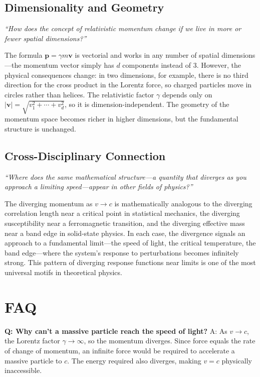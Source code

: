 \subsection*{Dimensionality and Geometry}
\textit{``How does the concept of relativistic momentum change if we live in more or fewer spatial dimensions?''}

The formula $\mathbf{p} = \gamma m \mathbf{v}$ is vectorial and works in any number of spatial dimensions---the momentum vector simply has $d$ components instead of 3. However, the physical consequences change: in two dimensions, for example, there is no third direction for the cross product in the Lorentz force, so charged particles move in circles rather than helices. The relativistic factor $\gamma$ depends only on $|\mathbf{v}| = \sqrt{v_1^2 + \cdots + v_d^2}$, so it is dimension-independent. The geometry of the momentum space becomes richer in higher dimensions, but the fundamental structure is unchanged.

\subsection*{Cross-Disciplinary Connection}
\textit{``Where does the same mathematical structure---a quantity that diverges as you approach a limiting speed---appear in other fields of physics?''}

The diverging momentum as $v \to c$ is mathematically analogous to the diverging correlation length near a critical point in statistical mechanics, the diverging susceptibility near a ferromagnetic transition, and the diverging effective mass near a band edge in solid-state physics. In each case, the divergence signals an approach to a fundamental limit---the speed of light, the critical temperature, the band edge---where the system's response to perturbations becomes infinitely strong. This pattern of diverging response functions near limits is one of the most universal motifs in theoretical physics.

\section*{FAQ}

\textbf{Q: Why can't a massive particle reach the speed of light?}
A: As $v \to c$, the Lorentz factor $\gamma \to \infty$, so the momentum diverges. Since force equals the rate of change of momentum, an infinite force would be required to accelerate a massive particle to $c$. The energy required also diverges, making $v = c$ physically inaccessible.

